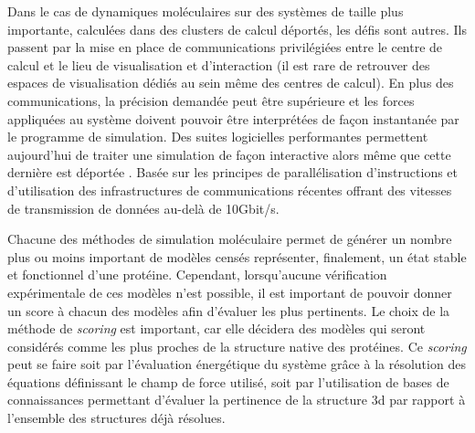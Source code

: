 Dans le cas de dynamiques moléculaires sur des systèmes de taille plus importante, calculées dans des clusters de calcul déportés, les défis sont autres. Ils passent par la mise en place de communications privilégiées entre le centre de calcul et le lieu de visualisation et d'interaction (il est rare de retrouver des espaces de visualisation dédiés au sein même des centres de calcul). En plus des communications, la précision demandée peut être supérieure et les forces appliquées au système doivent pouvoir être interprétées de façon instantanée par le programme de simulation. Des suites logicielles performantes permettent aujourd'hui de traiter une simulation de façon interactive alors même que cette dernière est déportée \cite{dreher2014exaviz}. Basée sur les principes de parallélisation d'instructions et d'utilisation des infrastructures de communications récentes offrant des vitesses de transmission de données au-delà de 10Gbit/s.

 \label{simu_eval}

Chacune des méthodes de simulation moléculaire permet de générer un nombre plus ou moins important de modèles censés représenter, finalement, un état stable et fonctionnel d'une protéine. Cependant, lorsqu'aucune vérification expérimentale de ces modèles n'est possible, il est important de pouvoir donner un score à chacun des modèles afin d'évaluer les plus pertinents. Le choix de la méthode de \textit{scoring} est important, car elle décidera des modèles qui seront considérés comme les plus proches de la structure native des protéines. Ce \textit{scoring} peut se faire soit par l'évaluation énergétique du système grâce à la résolution des équations définissant le champ de force utilisé, soit par l'utilisation de bases de connaissances permettant d'évaluer la pertinence de la structure 3d par rapport à l'ensemble des structures déjà résolues.

